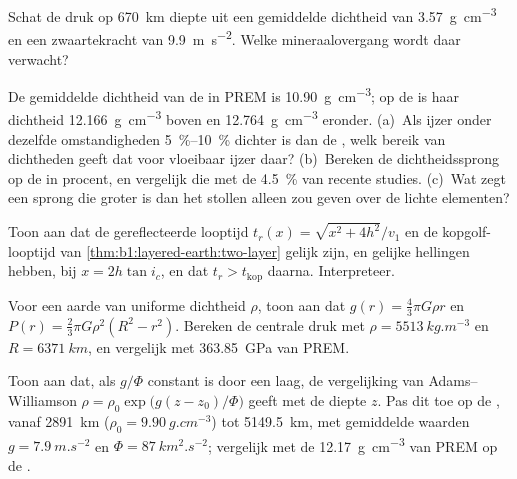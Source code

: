 \begin{exercise}[$\star\star$]\label{exo:b1:layered-earth:8}
Schat de druk op \qty{670}{km} diepte uit een gemiddelde dichtheid van \qty{3.57}{g.cm^{-3}} en een zwaartekracht van \qty{9.9}{m.s^{-2}}. Welke mineraalovergang
wordt daar verwacht?
\end{exercise}

\begin{exercise}[$\star\star$]\label{exo:b1:layered-earth:9}
De gemiddelde dichtheid van de  in PREM is \qty{10.90}{g.cm^{-3}}; op de  is haar dichtheid \qty{12.166}{g.cm^{-3}} boven en
\qty{12.764}{g.cm^{-3}} eronder. (a)~Als ijzer onder dezelfde omstandigheden \qtyrange{5}{10}{\percent} dichter is dan de , welk bereik van dichtheden
geeft dat voor vloeibaar ijzer daar? (b)~Bereken de dichtheidssprong op de  in procent, en vergelijk die met de \qty{4.5}{\percent} van recente
studies. (c)~Wat zegt een sprong die groter is dan het stollen alleen zou geven over de lichte elementen?
\end{exercise}

\begin{exercise}[$\star\star\star$]\label{exo:b1:layered-earth:10}
Toon aan dat de gereflecteerde looptijd $t_r(x) = \sqrt{x^2 + 4h^2}/v_1$ en de kopgolf-looptijd van \cref{thm:b1:layered-earth:two-layer} gelijk zijn, en gelijke
hellingen hebben, bij $x = 2h\tan i_c$, en dat $t_r > t_{\text{kop}}$ daarna. Interpreteer.
\end{exercise}

\begin{exercise}[$\star\star\star$]\label{exo:b1:layered-earth:11}
Voor een aarde van uniforme dichtheid $\rho$, toon aan dat $g(r) = \tfrac43\pi G\rho r$ en $P(r) = \tfrac23\pi G\rho^2(R^2 - r^2)$. Bereken de centrale druk met
$\rho = \qty{5513}{kg.m^{-3}}$ en $R = \qty{6371}{km}$, en vergelijk met \qty{363.85}{GPa} van PREM.
\end{exercise}

\begin{exercise}[$\star\star\star$]\label{exo:b1:layered-earth:12}
Toon aan dat, als $g/\Phi$ constant is door een laag, de vergelijking van Adams--Williamson $\rho = \rho_0\exp\bigl(g(z - z_0)/\Phi\bigr)$ geeft met de diepte $z$.
Pas dit toe op de , vanaf \qty{2891}{km} ($\rho_0 =
\qty{9.90}{g.cm^{-3}}$) tot \qty{5149.5}{km}, met gemiddelde waarden
$g = \qty{7.9}{m.s^{-2}}$ en $\Phi = \qty{87}{km^2.s^{-2}}$; vergelijk met de \qty{12.17}{g.cm^{-3}} van PREM op de .
\end{exercise}

